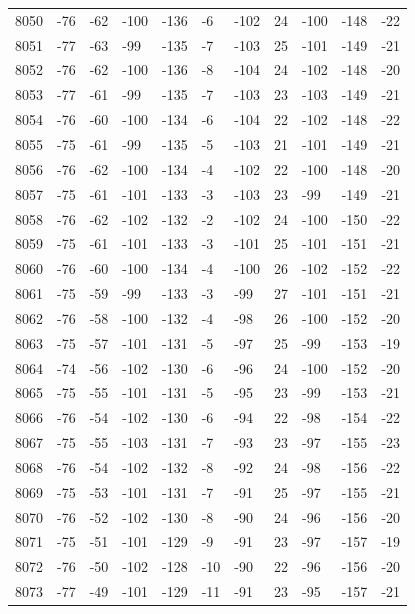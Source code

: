 \begin{table}[H]
\begin{tabular}{lllllllllll}
8050 & -76 & -62 & -100 & -136 & -6 & -102 & 24 & -100 & -148 & -22 \\
8051 & -77 & -63 & -99 & -135 & -7 & -103 & 25 & -101 & -149 & -21 \\
8052 & -76 & -62 & -100 & -136 & -8 & -104 & 24 & -102 & -148 & -20 \\
8053 & -77 & -61 & -99 & -135 & -7 & -103 & 23 & -103 & -149 & -21 \\
8054 & -76 & -60 & -100 & -134 & -6 & -104 & 22 & -102 & -148 & -22 \\
8055 & -75 & -61 & -99 & -135 & -5 & -103 & 21 & -101 & -149 & -21 \\
8056 & -76 & -62 & -100 & -134 & -4 & -102 & 22 & -100 & -148 & -20 \\
8057 & -75 & -61 & -101 & -133 & -3 & -103 & 23 & -99 & -149 & -21 \\
8058 & -76 & -62 & -102 & -132 & -2 & -102 & 24 & -100 & -150 & -22 \\
8059 & -75 & -61 & -101 & -133 & -3 & -101 & 25 & -101 & -151 & -21 \\
8060 & -76 & -60 & -100 & -134 & -4 & -100 & 26 & -102 & -152 & -22 \\
8061 & -75 & -59 & -99 & -133 & -3 & -99 & 27 & -101 & -151 & -21 \\
8062 & -76 & -58 & -100 & -132 & -4 & -98 & 26 & -100 & -152 & -20 \\
8063 & -75 & -57 & -101 & -131 & -5 & -97 & 25 & -99 & -153 & -19 \\
8064 & -74 & -56 & -102 & -130 & -6 & -96 & 24 & -100 & -152 & -20 \\
8065 & -75 & -55 & -101 & -131 & -5 & -95 & 23 & -99 & -153 & -21 \\
8066 & -76 & -54 & -102 & -130 & -6 & -94 & 22 & -98 & -154 & -22 \\
8067 & -75 & -55 & -103 & -131 & -7 & -93 & 23 & -97 & -155 & -23 \\
8068 & -76 & -54 & -102 & -132 & -8 & -92 & 24 & -98 & -156 & -22 \\
8069 & -75 & -53 & -101 & -131 & -7 & -91 & 25 & -97 & -155 & -21 \\
8070 & -76 & -52 & -102 & -130 & -8 & -90 & 24 & -96 & -156 & -20 \\
8071 & -75 & -51 & -101 & -129 & -9 & -91 & 23 & -97 & -157 & -19 \\
8072 & -76 & -50 & -102 & -128 & -10 & -90 & 22 & -96 & -156 & -20 \\
8073 & -77 & -49 & -101 & -129 & -11 & -91 & 23 & -95 & -157 & -21 \\

\end{tabular}
\end{table}
